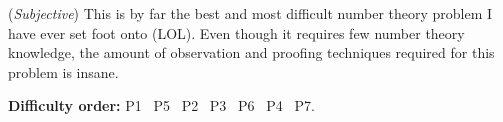 \documentclass[11pt]{article}
\theoremstyle{definition}
\begin{document}
        \begin{remark}
            (\emph{Subjective}) This is by far the best and most difficult number theory problem I have ever set foot onto (LOL). Even though it requires few number theory knowledge, the amount of observation and proofing techniques required for this problem is insane.
        \end{remark}

        \textbf{Difficulty order:} P1 \textrightarrow \ P5 \textrightarrow \ P2 \textrightarrow \ P3 \textrightarrow \ P6 \textrightarrow \ P4 \textrightarrow \ P7.
\end{document}
